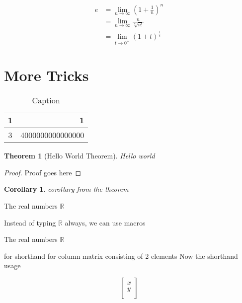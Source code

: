 \documentclass{article}
\newtheorem{theorem}{Theorem}[section]
\newtheorem{corollary}{Corollary}[theorem]
\newcommand{\R}{\mathbb{R}}
\newcommand{\cv}[2]{\begin{bmatrix}
#1 \\
#2 \\
\end{bmatrix}}
\begin{document}
\begin{equation}
\begin{split}
e & = \lim_{n\to\infty}\left(1 + \frac{1}{n}\right)^n \\
 &= \lim_{n\to\infty}\frac{n}{\sqrt[n]{n!}} \\
 &=\lim_{t\to{0^+}}(1+t)^{\frac{1}{t}}
\end{split}
\end{equation}


\section{More Tricks}

\begin{table}[h]
    \centering
    \begin{tabular}{|c|r|}
    \hline
       1  & 1 \\ \hline
       3  & 4000000000000000 \\
    \hline
    \end{tabular}
    \caption{Caption}
    \label{tab:my_label}
\end{table}



\begin{theorem}[Hello World Theorem] Hello world 
    
\end{theorem}
\begin{proof}
    Proof goes here
\end{proof}


\begin{corollary}
    corollary from the theorem
\end{corollary}


The real numbers $\mathbb{R}$


Instead of typing $\mathbb{R}$ always, we can use macros


The real numbers $\R$

for shorthand for column matrix consisting of 2 elements
Now the shorthand usage

$$
\cv{x}{y}
$$
\end{document}
